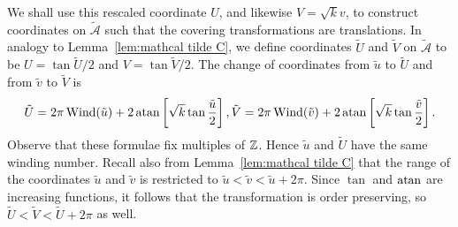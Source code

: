 \documentclass{article}
\begin{document}
We shall use this rescaled coordinate $U$, and likewise $V = \sqrt{k} v$, to construct coordinates on $\mathcal{\tilde{A}}$ such that the covering transformations are translations. 
In analogy to Lemma~\ref{lem:mathcal tilde C}, we define coordinates $\tilde{U}$ and $\tilde{V}$ on $\mathcal{\tilde{A}}$ to be $U = \tan \tilde{U}/2$ and $V = \tan \tilde{V}/2$.
The change of coordinates from $\tilde{u}$ to $\tilde{U}$ and from $\tilde{v}$ to $\tilde{V}$ is
\[
\tilde{U} = 2\pi\operatorname{Wind}(\tilde{u}) + 2 \operatorname{atan} \left[ \sqrt{k} \tan \frac{\tilde{u}}{2} \right],
\tilde{V} = 2\pi\operatorname{Wind}(\tilde{v}) + 2 \operatorname{atan} \left[ \sqrt{k} \tan \frac{\tilde{v}}{2} \right].
\]
Observe that these formulae fix multiples of $\mathbb{Z}$.
Hence $\tilde{u}$ and $\tilde{U}$ have the same winding number.
Recall also from Lemma~\ref{lem:mathcal tilde C} that the range of the coordinates $\tilde{u}$ and $\tilde{v}$ is restricted to $\tilde{u} < \tilde{v} < \tilde{u} + 2\pi$.
Since $\tan$ and $\operatorname{atan}$ are increasing functions, it follows that the transformation is order preserving, so $\tilde{U} < \tilde{V} < \tilde{U} + 2\pi$ as well.

\end{document}
